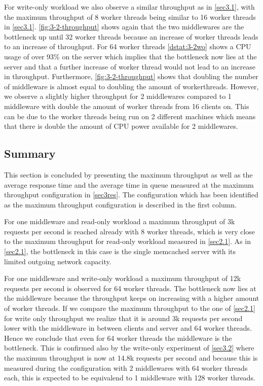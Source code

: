 \documentclass[11pt,a4paper]{article}
\begin{document}
For write-only workload we also observe a similar throughput as in \autoref{sec3.1}, with the maximum throughput of 8 worker threads being similar to 16 worker threads in \autoref{sec3.1}. \autoref{fig:3-2-throughput} shows again that the two middlewares are the bottleneck up until 32 worker threads because an increase of worker threads leads to an increase of throughput. For 64 worker threads \autoref{dstat:3-2wo} shows a CPU usage of over 93\% on the server which implies that the bottleneck now lies at the server and that a further increase of worker thread would not lead to an increase in throughput.
Furthermore, \autoref{fig:3-2-throughput} shows that doubling the number of middleware is almost equal to doubling the amount of workerthreads. However, we observe a slightly higher throughput for 2 middlewares compared to 1 middleware with double the amount of worker threads from 16 clients on. This can be due to the worker threads being run on 2 different machines which means that there is double the amount of CPU power available for 2 middlewares.

\subsection{Summary}

This section is concluded by presenting the maximum throughput as well as the average response time and the average time in queue measured at the maximum throughput configuration in \autoref{sec3res}. The configuration which has been identified as the maximum throughput configuration is described in the first column.

For one middleware and read-only workload a maximum throughput of 3k requests per second is reached already with 8 worker threads, which is very close to the maximum throughput for read-only workload measured in \autoref{sec2.1}. As in \autoref{sec2.1}, the bottleneck in this case is the single memcached server with its limited outgoing network capacity.

For one middleware and write-only workload a maximum throughput of 12k requests per second is observed for 64 worker threads. The bottleneck now lies at the middleware because the throughput keeps on increasing with a higher amount of worker threads. If we compare the maximum throughput to the one of \autoref{sec2.1} for write only throughput we realize that it is around 3k requests per second lower with the middleware in between clients and server and 64 worker threads. Hence we conclude that even for 64 worker threads the middleware is the bottleneck. This is confirmed also by the write-only experiment of \autoref{sec3.2} where the maximum throughput is now at 14.8k requests per second and because this is measured during the configuration with 2 middlewares with 64 worker threads each, this is expected to be equivalend to 1 middleware with 128 worker threads.
\end{document}

